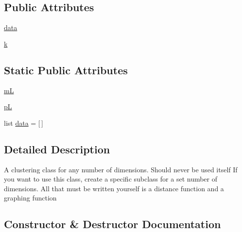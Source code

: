 \subsection*{Public Attributes}
\begin{DoxyCompactItemize}
\item 
\hyperlink{classdynamicfilterapp_1_1simulation__files_1_1cluster_1_1_clusterk_d_a511ae0b1c13f95e5f08f1a0dd3da3d93}{data}
\item 
\hyperlink{classdynamicfilterapp_1_1simulation__files_1_1cluster_1_1_clusterk_d_adc468c70fb574ebd07287b38d0d0676d}{k}
\end{DoxyCompactItemize}
\subsection*{Static Public Attributes}
\begin{DoxyCompactItemize}
\item 
\hyperlink{classdynamicfilterapp_1_1simulation__files_1_1cluster_1_1_clusterk_d_a3bf8bfc2a8d2d473a97085c452b7bf4e}{mL}
\item 
\hyperlink{classdynamicfilterapp_1_1simulation__files_1_1cluster_1_1_clusterk_d_abcc44a80b1ae4089dbfbaf1ac899b904}{pL}
\item 
list \hyperlink{classdynamicfilterapp_1_1simulation__files_1_1cluster_1_1_clusterk_d_a018aaab493af92ea83348b0db6e32328}{data} = \mbox{[}$\,$\mbox{]}
\end{DoxyCompactItemize}


\subsection{Detailed Description}
\begin{DoxyVerb}A clustering class for any number of dimensions. Should never be used itself
If you want to use this class, create a specific subclass for a set number
of dimensions. All that must be written yourself is a distance function and
a graphing function
\end{DoxyVerb}
 

\subsection{Constructor \& Destructor Documentation}
\mbox{\label{classdynamicfilterapp_1_1simulation__files_1_1cluster_1_1_clusterk_d_a49caefaf73ad77cd09e9fdf908975c43}} 
